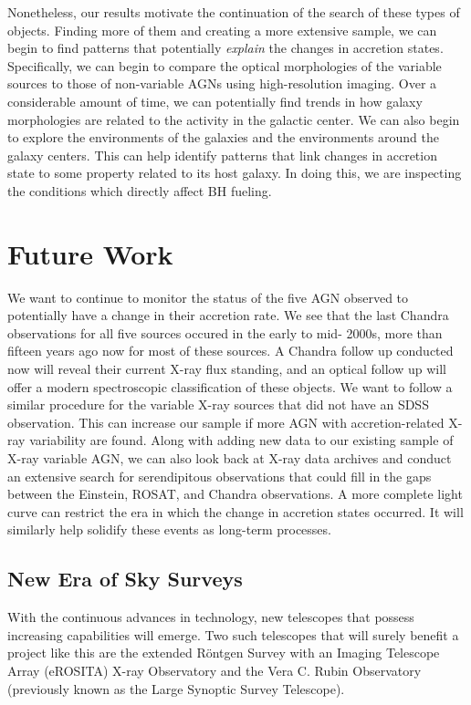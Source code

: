 Nonetheless, our results motivate the continuation of the search of these types of objects.
Finding more of them and creating a more extensive sample, we can begin to find patterns that potentially {\it explain\/} the changes in accretion states. 
Specifically, we can begin to compare the optical morphologies of the variable sources to those of non-variable AGNs using high-resolution imaging. 
Over a considerable amount of time, we can potentially find trends in how galaxy morphologies are related to the activity in the galactic center.  
We can also begin to explore the environments of the galaxies and the environments around the galaxy centers. 
This can help identify patterns that link changes in accretion state to some property related to its host galaxy. In doing this, we are inspecting the conditions which directly affect BH fueling.

\section{Future Work}


We want to continue to monitor the status of the five AGN observed to potentially have a change in their accretion rate. 
We see that the last Chandra observations for all five sources occured in the early to mid- 2000s, more than fifteen years ago now for most of these sources.
A Chandra follow up conducted now will reveal their current X-ray flux standing, and an optical follow up will offer a modern spectroscopic classification of these objects. 
We want to follow a similar procedure for the variable X-ray sources that did not have an SDSS observation. 
This can increase our sample if more AGN with accretion-related X-ray variability are found. 
Along with adding new data to our existing sample of X-ray variable AGN, we can also look back at X-ray data archives and conduct an extensive search for serendipitous observations that could fill in the gaps between the Einstein, ROSAT, and Chandra observations. 
A more complete light curve can restrict the era in which the change in accretion states occurred. 
It will similarly help solidify these events as long-term processes.



\subsection{New Era of Sky Surveys}

With the continuous advances in technology, new telescopes that possess increasing capabilities will emerge.
Two such telescopes that will surely benefit a project like this are the extended R\"{o}ntgen Survey with an Imaging Telescope Array (eROSITA) X-ray Observatory and the Vera C. Rubin Observatory (previously known as the Large Synoptic Survey Telescope).

